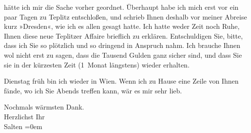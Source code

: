                hätte ich mir die Sache vorher geordnet. Überhaupt habe ich mich erst vor ein paar
               Tagen zu Teplitz entschloßen, und schrieb Ihnen
               deshalb vor meiner Abreise kurz »Dresden«, wie
               ich es allen gesagt hatte. Ich hatte {\pb}weder Zeit noch Ruhe, Ihnen
               diese neue Teplitzer Affaire brieflich zu
               erklären. Entschuldigen Sie, bitte, dass ich Sie so plötzlich und so dringend in
               Anspruch nahm. Ich brauche Ihnen wol nicht erst zu sagen, dass die Tausend Gulden
               ganz sicher sind, und dass Sie sie in der kürzesten Zeit (1 Monat längstens) wieder
               erhalten.\pend
           
\pstart
           Dienstag früh bin ich wieder in Wien. Wenn ich zu Hause eine Zeile von Ihnen fände, wo ich Sie
                  Abends{ }{\pb}treffen kann, wär es mir sehr
               lieb.\pend
           
\pstart
           Nochmals wärmsten Dank. {\\[\baselineskip]}Herzlichst Ihr {\\[\baselineskip]}\spacefill\mbox{Salten}\pend
           \leftskip=0em{}\endnumbering{}  
      
